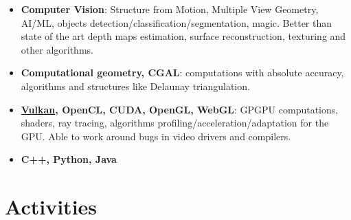 \documentclass[11pt,oneside]{article}
\newcommand{\hhref}[2]{\href{#1}{\color{blue}#2}}
\begin{document}
\begin{itemize}
    \item{\textbf{Computer Vision}}: Structure from Motion, Multiple View Geometry, AI/ML, objects detection/classification/segmentation, magic.
    Better than state of the art depth maps estimation, surface reconstruction, texturing and other algorithms.

    \item{\textbf{Computational geometry, CGAL}}: computations with absolute accuracy, algorithms and structures like Delaunay triangulation.

    \item{\textbf{\hhref{https://github.com/GPGPUCourse/GPGPUVulkan}{Vulkan}, OpenCL, CUDA, OpenGL, WebGL}}: GPGPU computations, shaders, ray tracing, algorithms profiling/acceleration/adaptation for the GPU. Able to work around bugs in video drivers and compilers.

    \item{\textbf{C++, Python, Java}}
\end{itemize}


\vspace{-9pt}
\section*{\textbf{Activities}}
\vspace{-9pt}
\end{document}
